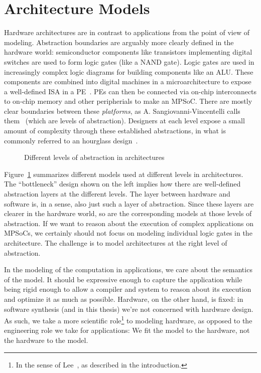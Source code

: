 \section{Architecture Models}

\label{sec:arch_models}
Hardware architectures are in contrast to applications from the point of view of modeling.
Abstraction boundaries are arguably more clearly defined in the hardware world:
semiconductor components like transistors implementing digital switches are used to form logic gates (like a NAND gate).
Logic gates are used in increasingly complex logic diagrams for building components like an \ac{ALU}.
These components are combined into digital machines in a microarchitecture to expose a well-defined \acf{ISA} in a \ac{PE}~\cite{lee2017plato}.
\acp{PE} can then be connected via on-chip interconnects to on-chip memory and other peripherials to make an \ac{MPSoC}.
There are mostly clear boundaries between these \emph{platforms}, as A. Sangiovanni-Vincentelli calls them~\cite{sangiovanni2007quo} (which are levels of abstraction).
Designers at each level expose a small amount of complexity through these established abstractions, in what is commonly referred to an hourglass design~\cite{10.1145/3274770}.

\begin{figure}[h]
	\centering
\resizebox{0.8\textwidth}{!}{
   \begin{tikzpicture}
     
   \end{tikzpicture}
 }
   \caption{Different levels of abstraction in architectures}
   \label{fig:architecture_abstractions}
\end{figure}

Figure~\ref{fig:architecture_abstractions} summarizes different models used at different levels in architectures.
The ``bottleneck'' design shown on the left implies how there are well-defined abstraction layers at the different levels.
The layer between hardware and software is, in a sense, also just such a layer of abstraction.
Since these layers are clearer in the hardware world, so are the corresponding models at those levels of abstraction.
If we want to reason about the execution of complex applications on \acp{MPSoC}, we certainly should not focus on modeling individual logic gates in the architecture.
The challenge is to model architectures at the right level of abstraction.

In the modeling of the computation in applications, we care about the semantics of the model.
It should be expressive enough to capture the application while being rigid enough to allow a compiler and system to reason about its execution and optimize it as much as possible.
Hardware, on the other hand, is fixed: in software synthesis (and in this thesis) we're not concerned with hardware design.
As such, we take a more scientific role\footnote{In the sense of Lee~\cite{lee2017plato}, as described in the introduction.} to modeling hardware, as opposed to the engineering role we take for applications: We fit the model to the hardware, not the hardware to the model. 

